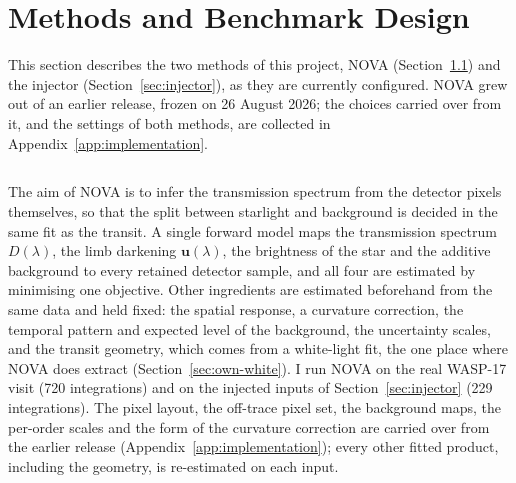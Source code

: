 \section{Methods and Benchmark Design}
\label{sec:methods}

This section describes the two methods of this project, NOVA
(Section~\ref{sec:nova}) and the injector (Section~\ref{sec:injector}), as
they are currently configured. NOVA grew out of an earlier release, frozen on
26 August 2026; the choices carried over from it, and the settings of both
methods, are collected in Appendix~\ref{app:implementation}.

\subsection{\nova{}}
\label{sec:nova}

The aim of NOVA is to infer the transmission spectrum from the detector
pixels themselves, so that the split between starlight and background is
decided in the same fit as the transit. A single forward model maps the
transmission spectrum $D(\lambda)$, the limb darkening $\bm{u}(\lambda)$, the
brightness of the star and the additive background to every retained detector
sample, and all four are estimated by minimising one objective. Other
ingredients are estimated beforehand from the same data and held fixed: the
spatial response, a curvature correction, the temporal pattern and expected
level of the background, the uncertainty scales, and the transit geometry,
which comes from a white-light fit, the one place where NOVA does extract
(Section~\ref{sec:own-white}). I run NOVA on the real
WASP-17 visit (720 integrations) and on the injected inputs of
Section~\ref{sec:injector} (229 integrations). The pixel layout, the off-trace pixel set,
the background maps, the per-order scales and the form of the curvature
correction are carried over from the earlier release
(Appendix~\ref{app:implementation}); every other fitted product, including
the geometry, is re-estimated on each input.

